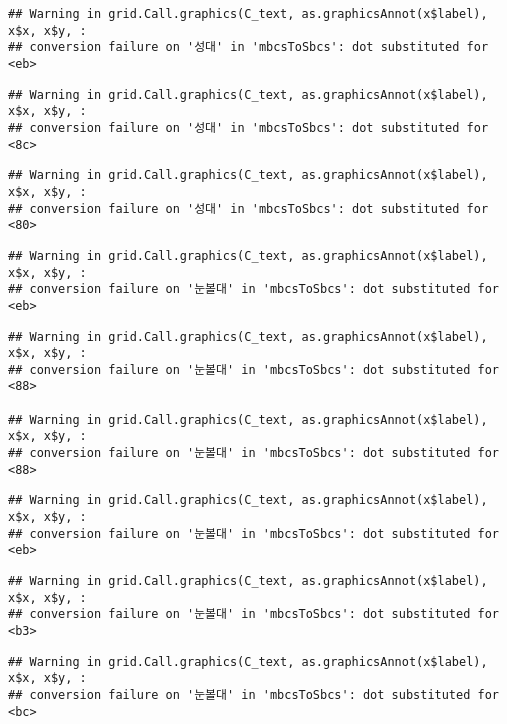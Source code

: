 \documentclass[
]{article}
\begin{document}
\begin{verbatim}
## Warning in grid.Call.graphics(C_text, as.graphicsAnnot(x$label), x$x, x$y, :
## conversion failure on '성대' in 'mbcsToSbcs': dot substituted for <eb>
\end{verbatim}

\begin{verbatim}
## Warning in grid.Call.graphics(C_text, as.graphicsAnnot(x$label), x$x, x$y, :
## conversion failure on '성대' in 'mbcsToSbcs': dot substituted for <8c>
\end{verbatim}

\begin{verbatim}
## Warning in grid.Call.graphics(C_text, as.graphicsAnnot(x$label), x$x, x$y, :
## conversion failure on '성대' in 'mbcsToSbcs': dot substituted for <80>
\end{verbatim}

\begin{verbatim}
## Warning in grid.Call.graphics(C_text, as.graphicsAnnot(x$label), x$x, x$y, :
## conversion failure on '눈볼대' in 'mbcsToSbcs': dot substituted for <eb>
\end{verbatim}

\begin{verbatim}
## Warning in grid.Call.graphics(C_text, as.graphicsAnnot(x$label), x$x, x$y, :
## conversion failure on '눈볼대' in 'mbcsToSbcs': dot substituted for <88>

## Warning in grid.Call.graphics(C_text, as.graphicsAnnot(x$label), x$x, x$y, :
## conversion failure on '눈볼대' in 'mbcsToSbcs': dot substituted for <88>
\end{verbatim}

\begin{verbatim}
## Warning in grid.Call.graphics(C_text, as.graphicsAnnot(x$label), x$x, x$y, :
## conversion failure on '눈볼대' in 'mbcsToSbcs': dot substituted for <eb>
\end{verbatim}

\begin{verbatim}
## Warning in grid.Call.graphics(C_text, as.graphicsAnnot(x$label), x$x, x$y, :
## conversion failure on '눈볼대' in 'mbcsToSbcs': dot substituted for <b3>
\end{verbatim}

\begin{verbatim}
## Warning in grid.Call.graphics(C_text, as.graphicsAnnot(x$label), x$x, x$y, :
## conversion failure on '눈볼대' in 'mbcsToSbcs': dot substituted for <bc>
\end{verbatim}
\end{document}
